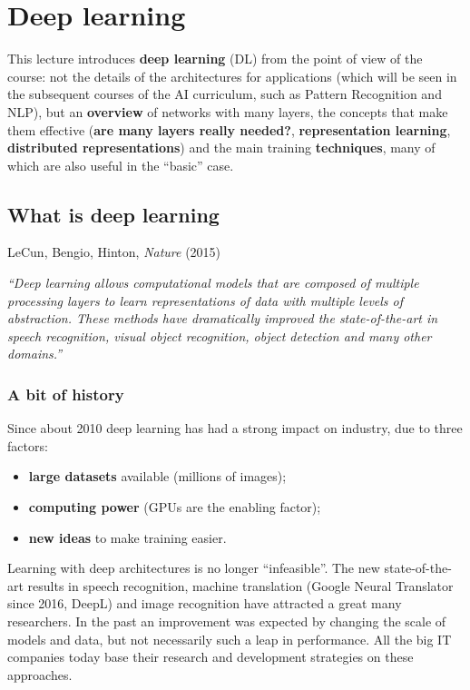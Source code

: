 \chapter{Deep learning}\label{ch-17}

This lecture introduces \textbf{deep learning} (DL) from the point of
view of the course: not the details of the architectures for
applications (which will be seen in the subsequent courses of the AI
curriculum, such as Pattern Recognition and NLP), but an
\textbf{overview} of networks with many layers, the concepts that make
them effective (\textbf{are many layers really needed?},
\textbf{representation learning}, \textbf{distributed representations})
and the main training \textbf{techniques}, many of which are also
useful in the ``basic'' case.

\section{What is deep learning}\label{che-cosuxe8-il-deep-learning}

\begin{boxnote}{LeCun, Bengio, Hinton, \emph{Nature} (2015)}

\emph{``Deep learning allows computational models that are composed of
multiple processing layers to learn representations of data with
multiple levels of abstraction. These methods have dramatically
improved the state-of-the-art in speech recognition, visual object
recognition, object detection and many other domains.''}

\end{boxnote}

\subsection{A bit of history}\label{un-po-di-storia}

Since about 2010 deep learning has had a strong impact on industry, due
to three factors:

\begin{itemize}
\tightlist
\item
  \textbf{large datasets} available (millions of images);
\item
  \textbf{computing power} (GPUs are the enabling factor);
\item
  \textbf{new ideas} to make training easier.
\end{itemize}

Learning with deep architectures is no longer ``infeasible''. The new
state-of-the-art results in speech recognition, machine translation
(Google Neural Translator since 2016, DeepL) and image recognition have
attracted a great many researchers. In the past an improvement was
expected by changing the scale of models and data, but not necessarily
such a leap in performance. All the big IT companies today base their
research and development strategies on these approaches.

